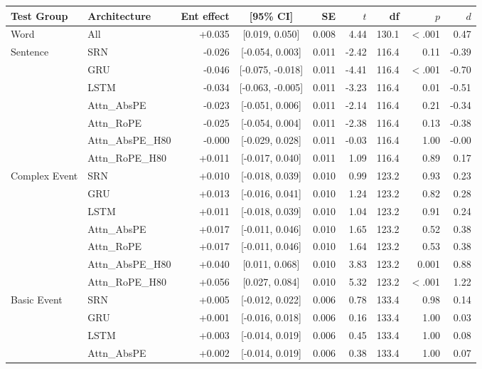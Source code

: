 \begin{table}[t]
\centering\small
\begin{tabular}{@{}llrcrrrrr@{}}
\toprule
\textbf{Test Group} & \textbf{Architecture} & \textbf{Ent effect} & \textbf{[95\% CI]} & \textbf{SE} & $t$ & \textbf{df} & $p$ & $d$ \\
\midrule
Word & All & +0.035 & [0.019, 0.050] & 0.008 & 4.44 & 130.1 & $<$.001 & 0.47 \\
\addlinespace
Sentence & SRN & -0.026 & [-0.054, 0.003] & 0.011 & -2.42 & 116.4 & 0.11 & -0.39 \\
 & GRU & -0.046 & [-0.075, -0.018] & 0.011 & -4.41 & 116.4 & $<$.001 & -0.70 \\
 & LSTM & -0.034 & [-0.063, -0.005] & 0.011 & -3.23 & 116.4 & 0.01 & -0.51 \\
 & Attn\_AbsPE & -0.023 & [-0.051, 0.006] & 0.011 & -2.14 & 116.4 & 0.21 & -0.34 \\
 & Attn\_RoPE & -0.025 & [-0.054, 0.004] & 0.011 & -2.38 & 116.4 & 0.13 & -0.38 \\
 & Attn\_AbsPE\_H80 & -0.000 & [-0.029, 0.028] & 0.011 & -0.03 & 116.4 & 1.00 & -0.00 \\
 & Attn\_RoPE\_H80 & +0.011 & [-0.017, 0.040] & 0.011 & 1.09 & 116.4 & 0.89 & 0.17 \\
\addlinespace
Complex Event & SRN & +0.010 & [-0.018, 0.039] & 0.010 & 0.99 & 123.2 & 0.93 & 0.23 \\
 & GRU & +0.013 & [-0.016, 0.041] & 0.010 & 1.24 & 123.2 & 0.82 & 0.28 \\
 & LSTM & +0.011 & [-0.018, 0.039] & 0.010 & 1.04 & 123.2 & 0.91 & 0.24 \\
 & Attn\_AbsPE & +0.017 & [-0.011, 0.046] & 0.010 & 1.65 & 123.2 & 0.52 & 0.38 \\
 & Attn\_RoPE & +0.017 & [-0.011, 0.046] & 0.010 & 1.64 & 123.2 & 0.53 & 0.38 \\
 & Attn\_AbsPE\_H80 & +0.040 & [0.011, 0.068] & 0.010 & 3.83 & 123.2 & 0.001 & 0.88 \\
 & Attn\_RoPE\_H80 & +0.056 & [0.027, 0.084] & 0.010 & 5.32 & 123.2 & $<$.001 & 1.22 \\
\addlinespace
Basic Event & SRN & +0.005 & [-0.012, 0.022] & 0.006 & 0.78 & 133.4 & 0.98 & 0.14 \\
 & GRU & +0.001 & [-0.016, 0.018] & 0.006 & 0.16 & 133.4 & 1.00 & 0.03 \\
 & LSTM & +0.003 & [-0.014, 0.019] & 0.006 & 0.45 & 133.4 & 1.00 & 0.08 \\
 & Attn\_AbsPE & +0.002 & [-0.014, 0.019] & 0.006 & 0.38 & 133.4 & 1.00 & 0.07 \\

\end{tabular}
\end{table}
